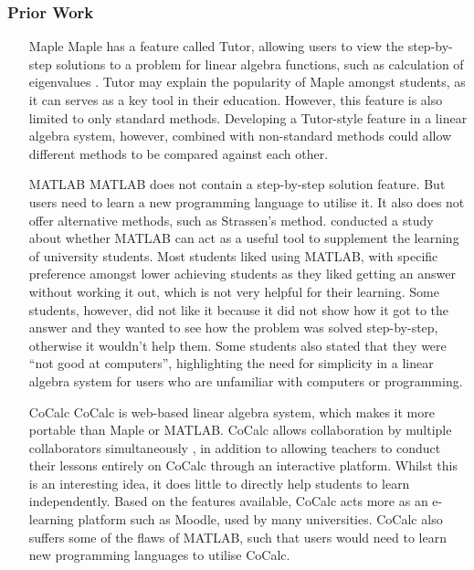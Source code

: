 \begin{frame}[allowframebreaks]
\frametitle{Prior Work}%
\begin{itemize}%
\item[Maple] Maple has a feature called Tutor, allowing users to view the step-by-step solutions to a problem for linear algebra functions, such as calculation of eigenvalues \cite{eigentutor}. Tutor may explain the popularity of Maple amongst students, as it can serves as a key tool in their education. However, this feature is also limited to only standard methods. Developing a Tutor-style feature in a linear algebra system, however, combined with non-standard methods could allow different methods to be compared against each other.\newline

\item[MATLAB] MATLAB does not contain a step-by-step solution feature. But users need to learn a new programming language to utilise it. It also does not offer alternative methods, such as Strassen's method. %
\cite{matlab} conducted a study about whether MATLAB can act as a useful tool to supplement the learning of university students. Most students liked using MATLAB, with specific preference amongst lower achieving students as they liked getting an answer without working it out, which is not very helpful for their learning. Some students, however, did not like it because it did not show how it got to the answer and they wanted to see how the problem was solved step-by-step, otherwise it wouldn't help them. Some students also stated that they were ``not good at computers'', highlighting the need for simplicity in a linear algebra system for users who are unfamiliar with computers or programming. %

\item[CoCalc] CoCalc \cite{Stein2018a} is web-based linear algebra system, which makes it more portable than Maple or MATLAB. CoCalc allows collaboration by multiple collaborators simultaneously \cite{collab}, in addition to allowing teachers to conduct their lessons entirely on CoCalc through an interactive platform. Whilst this is an interesting idea, it does little to directly help students to learn independently. Based on the features available, CoCalc acts more as an e-learning platform such as Moodle, used by many universities. CoCalc also suffers some of the flaws of MATLAB, such that users would need to learn new programming languages to utilise CoCalc.
\end{itemize}
\end{frame}

